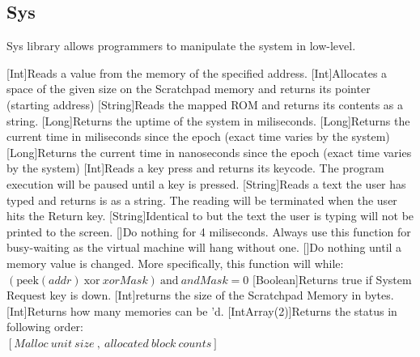 \subsection{Sys}

Sys library allows programmers to manipulate the system in low-level.


\begin{outline}
\1
\1[Int]{Reads a value from the memory of the specified address.}
\1[Int]{Allocates a space of the given size on the Scratchpad memory and returns its pointer (starting address)}
\1
\1
\1
\1[String]{Reads the mapped ROM and returns its contents as a string.}
\1[Long]{Returns the uptime of the system in miliseconds.}
\1[Long]{Returns the current time in miliseconds since the epoch (exact time varies by the system)}
\1[Long]{Returns the current time in nanoseconds since the epoch (exact time varies by the system)}
\1
\1
\1[Int]{Reads a key press and returns its keycode. The program execution will be paused until a key is pressed.}
\1[String]{Reads a text the user has typed and returns is as a string. The reading will be terminated when the user hits the Return key.}
\1[String]{Identical to  but the text the user is typing will not be printed to the screen.}
\1[]{Do nothing for 4 miliseconds. Always use this function for busy-waiting as the virtual machine will hang without one.}
\1[]{Do nothing until a memory value is changed. More specifically, this function will  while:\\$ (\textrm{peek}(addr)\ \textrm{xor}\ xorMask)\ \textrm{and}\ andMask = 0 $}
\1[Boolean]{Returns true if System Request key is down.}
\1
\1[Int]{returns the size of the Scratchpad Memory in bytes.}
\1[Int]{Returns how many memories can be 'd.}
\1[IntArray(2)]{Returns the  status in following order:\\$ [Malloc\ unit\ size\ ,\ allocated\ block\ counts] $}
\end{outline}
